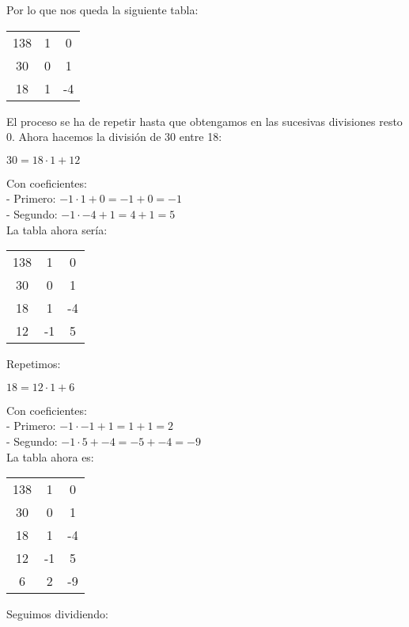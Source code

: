 \documentclass[11pt, a4paper, titlepage]{article}
\theoremstyle{theorem-style}
\theoremstyle{definition-style}
\theoremstyle{remark-style}
\theoremstyle{example-style}
\begin{document}
Por lo que nos queda la siguiente tabla:


\begin{center}
\begin{tabular}{c|cc}
138 & 1 & 0 \\
30 & 0 & 1 \\
\hline
18 & 1 & -4 \\
\end{tabular}
\end{center}

El proceso se ha de repetir hasta que obtengamos en las sucesivas divisiones resto 0. Ahora hacemos la
división de 30 entre 18:

$ 30 = 18 \cdot 1 + 12 $

Con coeficientes: \\
- Primero: $ -1 \cdot 1 + 0 = -1 + 0 = -1 $ \\
- Segundo: $ -1 \cdot -4 + 1 = 4 + 1 = 5 $ \\

La tabla ahora sería:

\begin{center}
\begin{tabular}{c|cc}
138 & 1 & 0 \\
30 & 0 & 1 \\
\hline
18 & 1 & -4 \\
\hline
12 & -1 & 5
\end{tabular}
\end{center}


Repetimos:

$ 18 = 12 \cdot 1 + 6 $

Con coeficientes: \\
- Primero: $ -1 \cdot -1 + 1 = 1 + 1 = 2 $ \\
- Segundo: $ -1 \cdot 5 + -4 = -5 + -4 = -9 $ \\

La tabla ahora es:

\begin{center}
\begin{tabular}{c|cc}
138 & 1 & 0 \\
30 & 0 & 1 \\
\hline
18 & 1 & -4 \\
\hline
12 & -1 & 5 \\
\hline
6 & 2 & -9 \\
\end{tabular}
\end{center}

Seguimos dividiendo:
\end{document}
